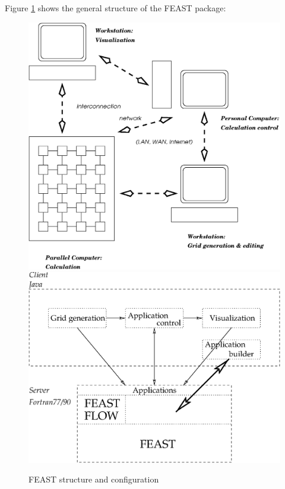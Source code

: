 \noindent
Figure \ref{skizze} shows the general structure of the FEAST package:

\begin{figure}[!h]
\begin{center}
\includegraphics[scale=0.3]{../psfiles/net.eps}\hspace*{1cm}\includegraphics[scale=0.34]{../psfiles/skizze.eps}
\end{center}
\label{skizze}
\caption{FEAST structure and configuration}
\end{figure}

